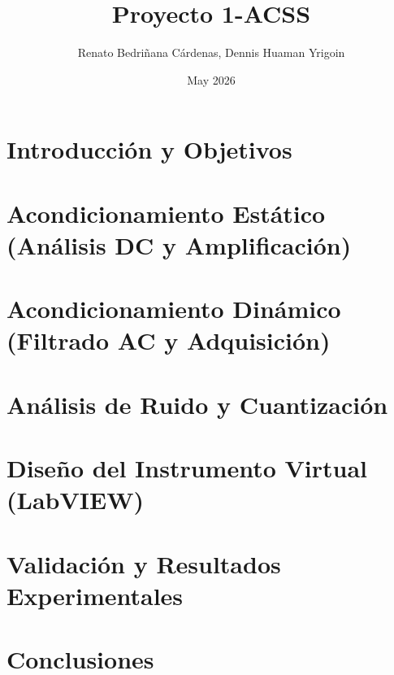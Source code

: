 \documentclass[12pt, a4paper]{article}
\title{Proyecto 1-ACSS}
\author{
Renato Bedriñana Cárdenas,
Dennis Huaman Yrigoin
}
\date{May 2026}
\begin{document}
\maketitle



\section{Introducción y Objetivos}


\section{Acondicionamiento Estático (Análisis DC y Amplificación)}


\section{Acondicionamiento Dinámico (Filtrado AC y Adquisición)}


\section{Análisis de Ruido y Cuantización}


\section{Diseño del Instrumento Virtual (LabVIEW)}


\section{Validación y Resultados Experimentales}


\section{Conclusiones}




\end{document}

